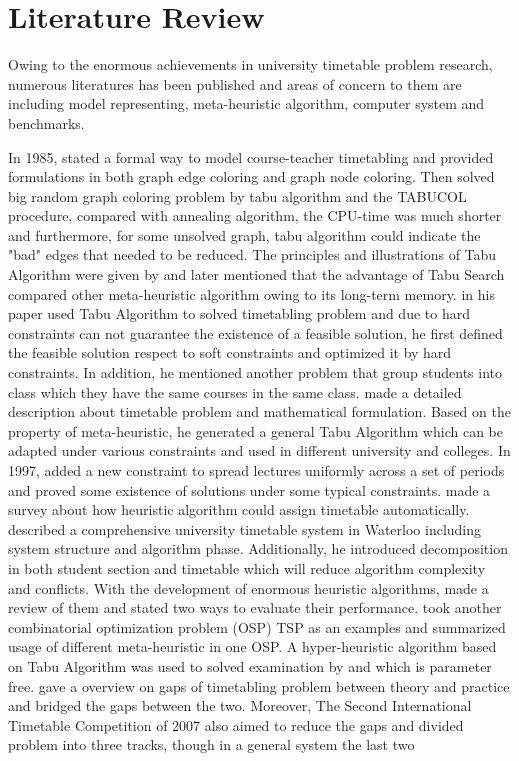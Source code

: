 \documentclass{article}
\begin{document}
\section{Literature Review}
\label{sec: Literature Review}

Owing to the enormous achievements in university timetable problem research, numerous literatures has been published and areas of concern to them are including model representing, meta-heuristic algorithm, computer system and benchmarks.

In 1985, \citet{(werra1985)introduction} stated a formal way to model course-teacher timetabling and provided formulations in both graph edge coloring and graph node coloring. Then \cite{(hertz1987)using} solved big random graph coloring problem by tabu algorithm and the TABUCOL procedure, compared with annealing algorithm, the CPU-time was much shorter and furthermore, for some unsolved graph, tabu algorithm could indicate the "bad" edges that needed to be reduced. The principles and illustrations of Tabu Algorithm were given by \cite{(werra1989)tabu} and later \cite{(glover1990)tabu} mentioned that the advantage of Tabu Search compared other meta-heuristic algorithm owing to its long-term memory. \cite{(hertz1991)tabu} in his paper used Tabu Algorithm to solved timetabling problem and due to hard constraints can not guarantee the existence of a feasible solution, he first defined the feasible solution respect to soft constraints and optimized it by hard constraints. In addition, he mentioned another problem that group students into class which they have the same courses in the same class. \cite{(costa1994)tabu} made a detailed description about timetable problem and mathematical formulation. Based on the property of meta-heuristic, he generated a general Tabu Algorithm which can be adapted under various constraints and used in different university and colleges. In 1997, \cite{(werra1997)combinatorics} added a new constraint to spread lectures uniformly across a set of periods and proved some existence of solutions under some typical constraints. \cite{(schaerf1999)survey} made a survey about how heuristic algorithm could assign timetable automatically. \cite{(carter2000)comprehensive} described a comprehensive university timetable system in Waterloo including system structure and algorithm phase. Additionally, he introduced decomposition in both student section and timetable which will reduce algorithm complexity and conflicts. With the development of enormous heuristic algorithms, \cite{(silver2004)overview} made a review of them and stated two ways to evaluate their performance. \cite{(gendreau2005)metaheuristics} took another combinatorial optimization problem (OSP) TSP as an examples and summarized usage of different meta-heuristic in one OSP. A hyper-heuristic algorithm based on Tabu Algorithm was used to solved examination by \cite{(hussin2005)tabu} and \cite{(kendall2005)investigation} which is parameter free. \cite{(mccollum2006)perspective} gave a overview on gaps of timetabling problem between theory and practice and bridged the gaps between the two. Moreover, The Second International Timetable Competition of 2007 also aimed to reduce the gaps and divided problem into three tracks, though in a general system the last two 
\end{document}
